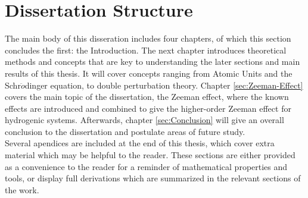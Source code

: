     \section{Dissertation Structure}
        The main body of this disseration includes four chapters, of which this section concludes the first: the Introduction. The next chapter introduces theoretical methods and concepts that are key to understanding the later sections and main results of this thesis. It will cover concepts ranging from Atomic Units and the Schr$\ddot{o}$dinger equation, to double perturbation theory. Chapter \ref{sec:Zeeman-Effect} covers the main topic of the dissertation, the Zeeman effect, where the known effects are introduced and combined to give the higher-order Zeeman effect for hydrogenic systems. Afterwards, chapter \ref{sec:Conclusion} will give an overall conclusion to the dissertation and postulate areas of future study.\\

        Several apendices are included at the end of this thesis, which cover extra material which may be helpful to the reader. These sections are either provided as a convenience to the reader for a reminder of mathematical properties and tools, or display full derivations which are summarized in the relevant sections of the work.

